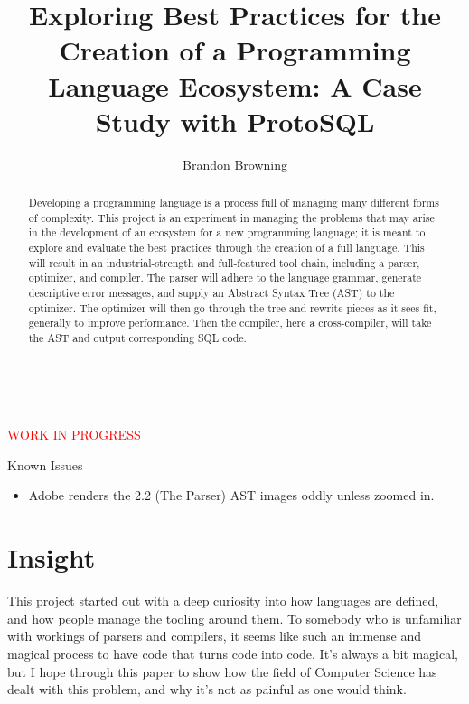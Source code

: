 \documentclass[titlepage]{article}
\begin{document}
	\thispagestyle{empty}
	\vspace*{\fill}
		~\centerline{\textcolor{red}{\Huge{WORK IN PROGRESS}}}
		\newline\newline

		\large{Known Issues}
		\begin{itemize}
			\item Adobe renders the 2.2 (The Parser) AST images oddly unless zoomed in.
		\end{itemize}
	\vspace*{\fill}
	\newpage

	\title{Exploring Best Practices for the Creation of a Programming Language Ecosystem: A Case Study with ProtoSQL}
	\author{Brandon Browning}
	\maketitle

	\begin{abstract}

		Developing a programming language is a process full of managing many different forms of complexity.  This project is an experiment in managing the problems that may arise in the development of an ecosystem for a new programming language; it is meant to explore and evaluate the best practices through the creation of a full language.  This will result in an industrial-strength and full-featured tool chain, including a parser, optimizer, and compiler.  The parser will adhere to the language grammar, generate descriptive error messages, and supply an Abstract Syntax Tree (AST) to the optimizer.  The optimizer will then go through the tree and rewrite pieces as it sees fit, generally to improve performance.  Then the compiler, here a cross-compiler, will take the AST and output corresponding SQL code.

	\end{abstract}

	\section{Insight}

		This project started out with a deep curiosity into how languages are defined, and how people manage the tooling around them.  To somebody who is unfamiliar with workings of parsers and compilers, it seems like such an immense and magical process to have code that turns code into code.  It's always a bit magical, but I hope through this paper to show how the field of Computer Science has dealt with this problem, and why it's not as painful as one would think.
\end{document}
